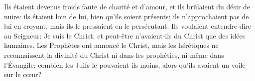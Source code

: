 Ils étaient devenus froids faute de charité et d’amour,
	et ils brûlaient du désir de nuire:
	ils étaient loin de lui, bien qu’ils soient présents;
	ils n’approchaient pas de lui en croyant,
	mais ils le pressaient en le persécutant.
Ils voulaient entendre dire au Seigneur: Je suis le Christ;
	et peut-être n’avaient-ils du Christ que des idées humaines.
Les Prophètes ont annoncé le Christ,
	mais les hérétiques ne reconnaissent la divinité du Christ
		ni dans les prophéties, ni même dans l’Évangile;
	combien les Juifs le pouvaient-ils moins,
	alors qu’ils avaient un voile sur le cœur?
